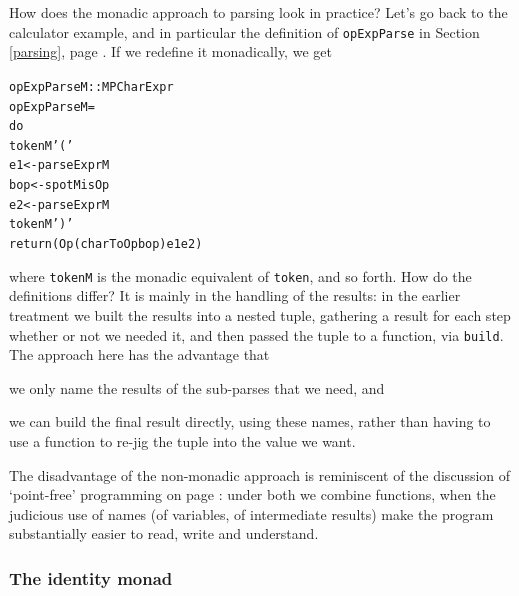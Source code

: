 How does the monadic approach to parsing look in practice? Let's go back to the calculator example, and in particular the definition of \texttt{opExpParse} in Section \ref{parsing}, page \pageref{opExpParse}. If we redefine it monadically, we get
\begin{alltt}
opExpParseM :: MP Char Expr
opExpParseM =
    do
      tokenM '('
      e1 <- parseExprM 
      bop <- spotM isOp
      e2 <- parseExprM
      tokenM ')'
      return (Op (charToOp bop) e1 e2)
\end{alltt}
where \texttt{tokenM} is the monadic equivalent of \texttt{token}, and so forth. How do the definitions differ? It is mainly in the handling of the results: in the earlier treatment we built the results into a nested tuple, gathering a result for each step whether or not we needed it, and then passed the tuple to a function, via \texttt{build}. The approach here has the advantage that
\begin{titemize}
\item
we only name the results of the sub-parses that we need, and
\item
we can build the final result directly, using these names, rather than having to use a function to re-jig the tuple into the value we want.
\end{titemize} 
The disadvantage of the non-monadic approach is reminiscent of the discussion of `point-free' programming on page \pageref{pointfree}: under both we combine functions, when the judicious use of names (of variables, of intermediate results) make the program substantially easier to read, write and understand.

\subsubsection*{The identity monad}

